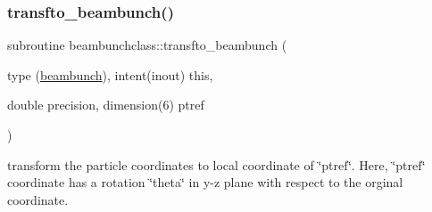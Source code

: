 \mbox{\label{namespacebeambunchclass_aef2d76ba15a23896de0838b2001d72b1}} 
\subsubsection{\texorpdfstring{transfto\_beambunch()}{transfto\_beambunch()}}
{\footnotesize\ttfamily subroutine beambunchclass\+::transfto\+\_\+beambunch (\begin{DoxyParamCaption}\item[{type (\mbox{\hyperlink{namespacebeambunchclass_structbeambunchclass_1_1beambunch}{beambunch}}), intent(inout)}]{this,  }\item[{double precision, dimension(6)}]{ptref }\end{DoxyParamCaption})}



transform the particle coordinates to local coordinate of \char`\"{}ptref\char`\"{}. Here, \char`\"{}ptref\char`\"{} coordinate has a rotation \char`\"{}theta\char`\"{} in y-\/z plane with respect to the orginal coordinate. 

